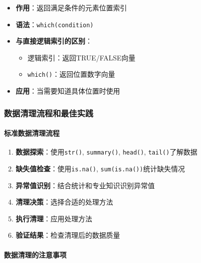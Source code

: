 \documentclass[
  twoside]{book}
\providecommand{\tightlist}{%
  \setlength{\itemsep}{0pt}\setlength{\parskip}{0pt}}
\begin{document}
\begin{itemize}
\tightlist
\item
  \textbf{作用}：返回满足条件的元素位置索引
\item
  \textbf{语法}：\texttt{which(condition)}
\item
  \textbf{与直接逻辑索引的区别}：

  \begin{itemize}
  \tightlist
  \item
    逻辑索引：返回TRUE/FALSE向量
  \item
    \texttt{which()}：返回位置数字向量
  \end{itemize}
\item
  \textbf{应用}：当需要知道具体位置时使用
\end{itemize}

\hypertarget{ux6570ux636eux6e05ux7406ux6d41ux7a0bux548cux6700ux4f73ux5b9eux8df5}{%
\subsubsection{数据清理流程和最佳实践}\label{ux6570ux636eux6e05ux7406ux6d41ux7a0bux548cux6700ux4f73ux5b9eux8df5}}

\hypertarget{ux6807ux51c6ux6570ux636eux6e05ux7406ux6d41ux7a0b}{%
\paragraph{标准数据清理流程}\label{ux6807ux51c6ux6570ux636eux6e05ux7406ux6d41ux7a0b}}

\begin{enumerate}
\def\labelenumi{\arabic{enumi}.}
\item
  \textbf{数据探索}：使用\texttt{str()}, \texttt{summary()}, \texttt{head()}, \texttt{tail()}了解数据
\item
  \textbf{缺失值检查}：使用\texttt{is.na()}, \texttt{sum(is.na())}统计缺失情况
\item
  \textbf{异常值识别}：结合统计和专业知识识别异常值
\item
  \textbf{清理决策}：选择合适的处理方法
\item
  \textbf{执行清理}：应用处理方法
\item
  \textbf{验证结果}：检查清理后的数据质量
\end{enumerate}

\hypertarget{ux6570ux636eux6e05ux7406ux7684ux6ce8ux610fux4e8bux9879}{%
\paragraph{数据清理的注意事项}\label{ux6570ux636eux6e05ux7406ux7684ux6ce8ux610fux4e8bux9879}}
\end{document}
